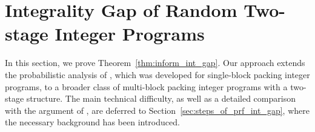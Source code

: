 \documentclass{article}
\newcommand{\xv}[0]{\mathbf{x}}
\begin{document}





\section{Integrality Gap of Random Two-stage Integer Programs}
\label{sec:int_gap}

In this section, we prove Theorem~\ref{thm:inform_int_gap}. Our approach extends the probabilistic analysis of \cite{dyer1989probabilistic}, which was developed for single-block packing integer programs, to a broader class of multi-block packing integer programs with a two-stage structure.  The main technical difficulty, as well as a detailed comparison with the argument of \cite{dyer1989probabilistic}, are deferred to Section~\ref{sec:steps_of_prf_int_gap}, where the necessary background has been introduced.
\end{document}
